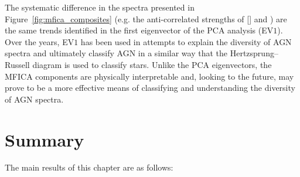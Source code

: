 The systematic difference in the spectra presented in Figure~\ref{fig:mfica_composites} (e.g. the anti-correlated strengths of [] and ) are the same trends identified in the first eigenvector of the \citet{boroson92} PCA analysis (EV$1$).
Over the years, EV$1$ has been used in attempts to explain the diversity of AGN spectra and ultimately classify AGN in a similar way that the Hertzsprung–Russell diagram is used to classify stars.
Unlike the PCA eigenvectors, the MFICA components are physically interpretable and, looking to the future, may prove to be a more effective means of classifying and understanding the diversity of AGN spectra.

\section{Summary}

The main results of this chapter are as follows:

